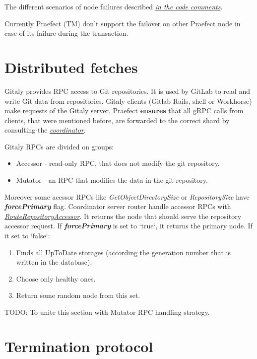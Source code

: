 \documentclass[acmlarge, screen, nonacm]{acmart}
\begin{document}
The different scenarios of node failures described \emph{\href{https://gitlab.com/gitlab-org/gitaly/-/blob/master/internal/praefect/nodes/sql_elector.go\#L401}{in the code comments}}.

Currently Praefect (TM) don't support the failover on other Praefect node in case of its failure during the transaction.

\section{Distributed fetches}
Gitaly provides RPC access to Git repositories. It is used by GitLab to read and write Git data from repositories.
Gitaly clients (Gitlab Rails, shell or Workhorse) make requests of the Gitaly server.  Praefect \textbf{ensures} 
that all gRPC calls from clients, that were mentioned before, are forwarded to the correct shard by consulting the
\emph{\href{https://gitlab.com/gitlab-org/gitaly/-/blob/master/internal/praefect/coordinator.go}{coordinator}}.

Gitaly RPCs are divided on groups:
\begin{itemize}
\item Accessor - read-only RPC, that does not modify the git repository.
\item Mutator - an RPC that modifies the data in the git repository.
\end{itemize}

Moreover some acessor RPCs like \textit{GetObjectDirectorySize} or \textit{RepositorySize} have \textbf{\textit{forcePrimary}} flag. 
Coordinator server router handle accessor RPCs with  
\emph{\href{https://gitlab.com/gitlab-org/gitaly/-/blob/master/internal/praefect/coordinator.go\#L356}{ RouteRepositoryAccessor}}. 
It returns the node that should serve the repository accessor request. If \textbf{\textit{forcePrimary }} is set to `true`, it returns the primary node. 
If it set to `false`: 
\begin{enumerate}
\item Finds all UpToDate storages (according the generation number that is written in the database).
\item Choose only healthy ones.
\item Return some random node from this set.
\end{enumerate}

TODO: To unite this section with Mutator RPC handling strategy.

\section{Termination protocol}
\end{document}
